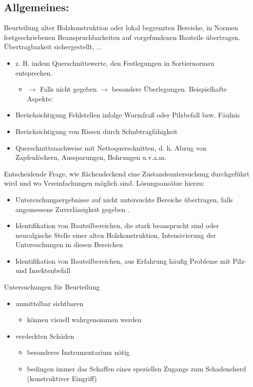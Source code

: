 \documentclass[fleqn,twoside]{article}
\begin{document}
    \subsection{Allgemeines:}
        Beurteilung alter Holzkonstruktion oder lokal begrenzten Bereiche, in Normen festgeschriebenen Beanspruchbarkeiten auf vorgefundenen Bauteile übertragen. Übertragbarkeit sichergestellt, ...
        \begin{itemize}
            \item z. B. indem Querschnittswerte, den Festlegungen in Sortiernormen entsprechen.
                \begin{itemize}
                    \item $\rightarrow$ Falls nicht gegeben $\rightarrow$ besondere Überlegungen. Beispielhafte Aspekte:
                \end{itemize}
            \item Berücksichtigung Fehlstellen infolge Wurmfraß oder Pilzbefall bzw. Fäulnis
            \item Berücksichtigung von Rissen durch Schubtragfähigkeit
            \item Querschnittsnachweise mit Nettoquerschnitten, d. h. Abzug von Zapfenlöchern, Aussparungen, Bohrungen u.v.a.m.
        \end{itemize}
        
        Entscheidende Frage, wie flächendeckend eine Zustandsuntersuchung durchgeführt wird und wo Vereinfachungen möglich sind. Lösungsansätze hierzu:
        \begin{itemize}
            \item Untersuchungsergebnisse auf nicht untersuchte Bereiche übertragen, falls angemessene Zuverlässigkeit gegeben .
            \item Identifikation von Bauteilbereichen, die stark beansprucht sind oder neuralgische Stelle einer alten Holzkonstruktion, Intensivierung der Untersuchungen in diesen Bereichen
            \item Identifikation von Bauteilbereichen, aus Erfahrung häufig Probleme mit Pilz- und Insektenbefall
        \end{itemize}
        
        Untersuchungen für Beurteilung
        \begin{itemize}
            \item unmittelbar sichtbaren
                \begin{itemize}
                    \item können visuell wahrgenommen werden
                \end{itemize}
            \item verdeckten Schäden
                \begin{itemize}
                    \item besonderes Instrumentarium nötig
                    \item bedingen immer das Schaffen eines speziellen Zugangs zum Schadensherd (konstruktiver Eingriff)
                \end{itemize}
        \end{itemize}
        
\end{document}
